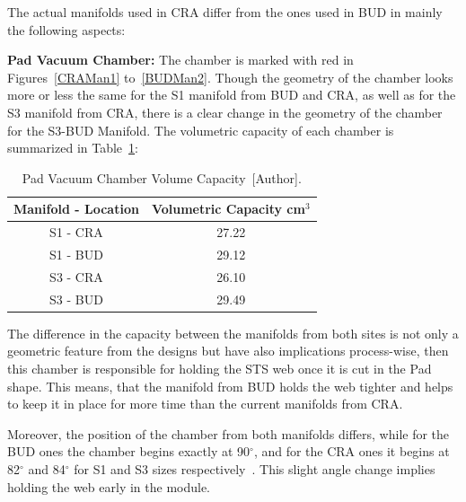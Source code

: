 The actual manifolds used in CRA differ from the ones used in BUD in mainly the following aspects:

\textbf{Pad Vacuum Chamber:} The chamber is marked with red in Figures~\ref{CRAMan1} to~\ref{BUDMan2}. Though the geometry of the chamber looks more or less the same for the S1 manifold from BUD and CRA, as well as for the S3 manifold from CRA, there is a clear change in the geometry of the chamber for the S3-BUD Manifold. The volumetric capacity of each chamber is summarized in Table~\ref{PadVacuumVol}:
    \begin{table}[H]
    \centering
    \scriptsize
    \begin{tabular}{cc}
    \hline
    \textbf{Manifold - Location} & \textbf{Volumetric Capacity cm$^3$} \\ \hline
    S1 - CRA                     & 27.22                              \\
    S1 - BUD                     & 29.12                              \\
    S3 - CRA                     & 26.10                              \\
    S3 - BUD                     & 29.49                              \\ \hline
    \end{tabular}%
    \caption{Pad Vacuum Chamber Volume Capacity~[Author].}
    \label{PadVacuumVol}
    \end{table}
    
The difference in the capacity between the manifolds from both sites is not only a geometric feature from the designs but have also implications process-wise, then this chamber is responsible for holding the STS web once it is cut in the Pad shape. This means, that the manifold from BUD holds the web tighter and helps to keep it in place for more time than the current manifolds from CRA.

Moreover, the position of the chamber from both manifolds differs, while for the BUD ones the chamber begins exactly at 90$^{\circ}$, and for the CRA ones it begins at 82$^{\circ}$ and 84$^{\circ}$ for S1 and S3 sizes respectively~\cite{manifold, manifold2}. This slight angle change implies holding the web early in the module. 

